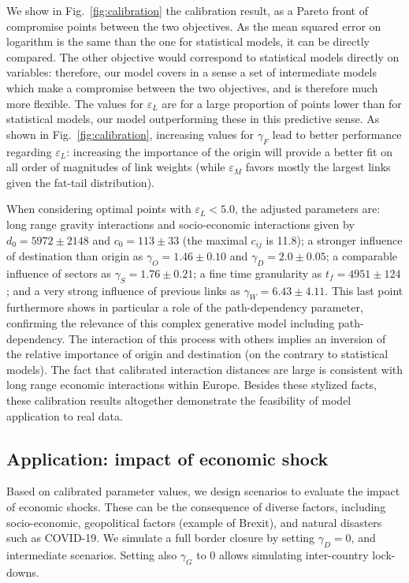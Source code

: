 \documentclass[10pt,letterpaper]{article}
\begin{document}
We show in Fig.~\ref{fig:calibration} the calibration result, as a Pareto front of compromise points between the two objectives. As the mean squared error on logarithm is the same than the one for statistical models, it can be directly compared. The other objective would correspond to statistical models directly on variables: therefore, our model covers in a sense a set of intermediate models which make a compromise between the two objectives, and is therefore much more flexible. The values for $\varepsilon_L$ are for a large proportion of points lower than for statistical models, our model outperforming these in this predictive sense. As shown in Fig.~\ref{fig:calibration}, increasing values for $\gamma_F$ lead to better performance regarding $\varepsilon_L$: increasing the importance of the origin will provide a better fit on all order of magnitudes of link weights (while $\varepsilon_M$ favors mostly the largest links given the fat-tail distribution).

When considering optimal points with $\varepsilon_L < 5.0$, the adjusted parameters are: long range gravity interactions and socio-economic interactions given by $d_0 = 5972 \pm 2148$ and $c_0 = 113 \pm 33$ (the maximal $c_{ij}$ is 11.8); a stronger influence of destination than origin as $\gamma_O = 1.46 \pm 0.10$ and $\gamma_D = 2.0 \pm 0.05$; a comparable influence of sectors as $\gamma_S = 1.76 \pm 0.21$; a fine time granularity as $t_f = 4951 \pm 124$; and a very strong influence of previous links as $\gamma_W = 6.43 \pm 4.11$. This last point furthermore shows in particular a role of the path-dependency parameter, confirming the relevance of this complex generative model including path-dependency. The interaction of this process with others implies an inversion of the relative importance of origin and destination (on the contrary to statistical models). The fact that calibrated interaction distances are large is consistent with long range economic interactions within Europe. Besides these stylized facts, these calibration results altogether demonstrate the feasibility of model application to real data.

\subsection*{Application: impact of economic shock}

Based on calibrated parameter values, we design scenarios to evaluate the impact of economic shocks. These can be the consequence of diverse factors, including socio-economic, geopolitical factors (example of Brexit), and natural disasters such as COVID-19. We simulate a full border closure by setting $\gamma_D = 0$, and intermediate scenarios. Setting also $\gamma_G$ to 0 allows simulating inter-country lock-downs.
\end{document}

